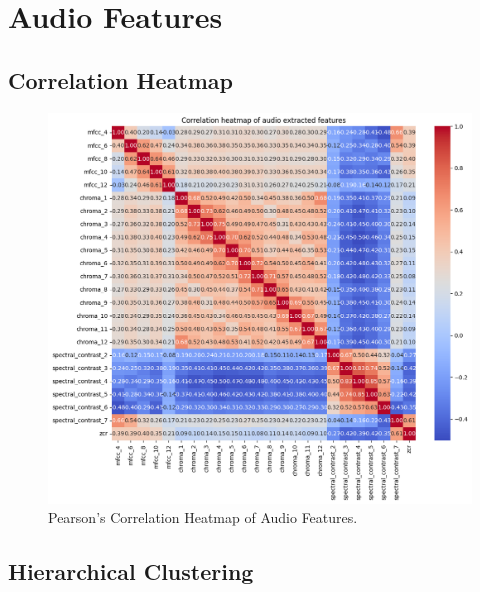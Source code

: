 \section{Audio Features}

\subsection*{Correlation Heatmap}
\label{sec:correlationheatmapsspotifyfeatures}

\begin{center}
\begin{figure}[H]
  \centering
  \includegraphics[width=6in]{img/corr_heatmap_audio.png}
  \caption{Pearson's Correlation Heatmap of Audio Features.}
  \label{Figure:corr_heatmap_audio}
\end{figure}
\end{center}

\subsection*{Hierarchical Clustering}
\label{sec:hierarchicalclustering}

